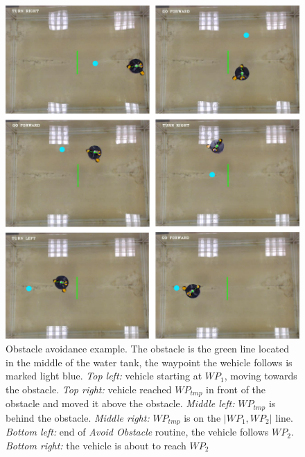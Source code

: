 \begin{figure}
\centering
\includegraphics[width=\textwidth]{Files/Figures/obstacle_avoidance.png}
\caption[Obstacle avoidance example]{Obstacle avoidance example. The obstacle is the green line located in the middle of the water tank, the waypoint the wehicle follows is marked light blue. \textit{Top left:} vehicle starting at $WP_1$, moving towards the obstacle. \textit{Top right:} vehicle reached $WP_{tmp}$ in front of the obstacle and moved it above the obstacle. \textit{Middle left:} $WP_{tmp}$ is behind the obstacle. \textit{Middle right:} $WP_{tmp}$ is on the $|WP_1,WP_2|$ line. \textit{Bottom left:} end of \textit{Avoid Obstacle} routine, the vehicle follows $WP_2$. \textit{Bottom right:} the vehicle is about to reach $WP_2$}
\label{fig:obstacle_avoidance}
\end{figure}

